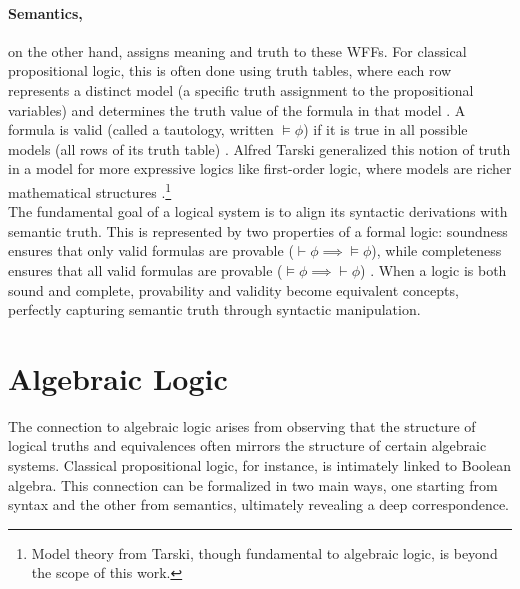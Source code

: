 \paragraph{Semantics,} on the other hand, assigns meaning and truth to these WFFs. For classical propositional logic, this is often done using truth tables, where each row represents a distinct model (a specific truth assignment to the propositional variables) and determines the truth value of the formula in that model \cite[Sec.~1.2]{Hajek1998}. A formula is valid (called a tautology, written $\models \phi$) if it is true in all possible models (all rows of its truth table) \cite[Sec.~1.2.2]{Hajek1998}. Alfred Tarski generalized this notion of truth in a model for more expressive logics like first-order logic, where models are richer mathematical structures \cite[Sec.~1.3, Defs.~1.3.1, 1.3.8]{Hajek1998}.\footnote{Model theory from Tarski, though fundamental to algebraic logic, is beyond the scope of this work.}\\

The fundamental goal of a logical system is to align its syntactic derivations with semantic truth. This is represented by two properties of a formal logic: soundness ensures that only valid formulas are provable ($\vdash \phi \implies \models \phi$), while completeness ensures that all valid formulas are provable ($\models \phi \implies \vdash \phi$) \cite[Lemmas~1.2.7, 1.2.9 and Thm.~1.2.11]{Hajek1998}. When a logic is both sound and complete, provability and validity become equivalent concepts, perfectly capturing semantic truth through syntactic manipulation.


\section{Algebraic Logic}

The connection to algebraic logic arises from observing that the structure of logical truths and equivalences often mirrors the structure of certain algebraic systems. Classical propositional logic, for instance, is intimately linked to Boolean algebra. This connection can be formalized in two main ways, one starting from syntax and the other from semantics, ultimately revealing a deep correspondence.\\



